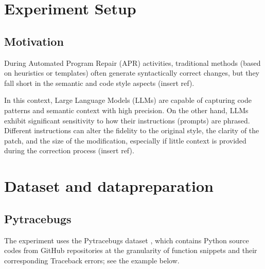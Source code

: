 \section{Experiment Setup}
\subsection{Motivation}

During Automated Program Repair (APR) activities, traditional methods (based on heuristics or templates) often generate syntactically correct changes, but they fall short in the semantic and code style aspects (insert ref).

In this context, Large Language Models (LLMs) are capable of capturing code patterns and semantic context with high precision.
On the other hand, LLMs exhibit significant sensitivity to how their instructions (prompts) are phrased. Different instructions can alter the fidelity to the original style, the clarity of the patch, and the size of the modification, especially if little context is provided during the correction process (insert ref).

\section{Dataset and datapreparation}

\subsection{Pytracebugs}
The experiment uses the Pytracebugs dataset \cite{Pytracebugs}, which contains Python source codes from GitHub repositories at the granularity of function snippets and their corresponding Traceback errors; see the example below.


